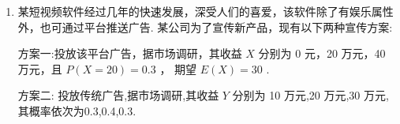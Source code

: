 \begin{enumerate}
\begin{enumerate}
\begin{jieda}
\begin{enumerate}
                $P\left( {{X}_{1} = {30}}\right)  = \dfrac{C_{2}^{2}}{C_{4}^{2}} = \dfrac{1}{6},P\left( {{X}_{1} = {60}}\right)  = \dfrac{C_{2}^{1}C_{2}^{1}}{C_{4}^{2}} = \dfrac{4}{6} = \dfrac{2}{3},P\left( {{X}_{1} = {90}}\right)  = \dfrac{C_{2}^{2}}{C_{4}^{2}} = \dfrac{1}{6}$
                
                $E\left( {X}_{1}\right)  = {30} \times  \dfrac{1}{6} + {60} \times  \dfrac{2}{3} + {90} \times  \dfrac{1}{6} = {60}$
                
                $D\left( {X}_{1}\right)  = {\left( {30} - {60}\right) }^{2} \times  \dfrac{1}{6} + {\left( {60} - {60}\right) }^{2} \times  \dfrac{2}{3} + {\left( {90} - {60}\right) }^{2} \times  \dfrac{1}{6} = {300}$
                
                根据方案二,设顾客的奖励额为 ${X}_{2}$ ,其可能取值为40,60,80
                
                $P\left( {{X}_{2} = {40}}\right)  = \dfrac{C_{2}^{2}}{C_{4}^{2}} = \dfrac{1}{6},P\left( {{X}_{2} = {60}}\right)  = \dfrac{C_{2}^{2}C_{2}^{1}}{C_{4}^{2}} = \dfrac{4}{6} = \dfrac{2}{3},P\left( {{X}_{2} = {80}}\right)  = \dfrac{C_{2}^{2}}{C_{4}^{2}} = \dfrac{1}{6}$
                
                $E\left( {X}_{2}\right)  = {40} \times  \dfrac{1}{6} + {60} \times  \dfrac{2}{3} + {80} \times  \dfrac{1}{6} = {60}$
                
                $D\left( {X}_{2}\right)  = {\left( {40} - {60}\right) }^{2} \times  \dfrac{1}{6} + {\left( {60} - {60}\right) }^{2} \times  \dfrac{2}{3} + {\left( {80} - {60}\right) }^{2} \times  \dfrac{1}{6} = \dfrac{400}{3}$
                
                商场对奖励总额的预算是 30000 元，故每个顾客平均奖励额最多为 60，两方案均符合要求，但方案二奖励的方差比方案一小，所以应选择方案二.
            \end{enumerate}
        \end{jieda}
        \item 某短视频软件经过几年的快速发展，深受人们的喜爱，该软件除了有娱乐属性外，也可通过平台推送广告. 某公司为了宣传新产品，现有以下两种宣传方案:
        
        方案一:投放该平台广告，据市场调研，其收益 $X$ 分别为 0 元，20 万元，40 万元，且 $P\left( {X = {20}}\right)  = {0.3}$ ， 期望 $E\left( X\right)  = {30}$ .
        
        方案二: 投放传统广告,据市场调研,其收益 $Y$ 分别为 10 万元,20 万元,30 万元,其概率依次为0.3,0.4,0.3.


\end{enumerate}
\end{enumerate}
